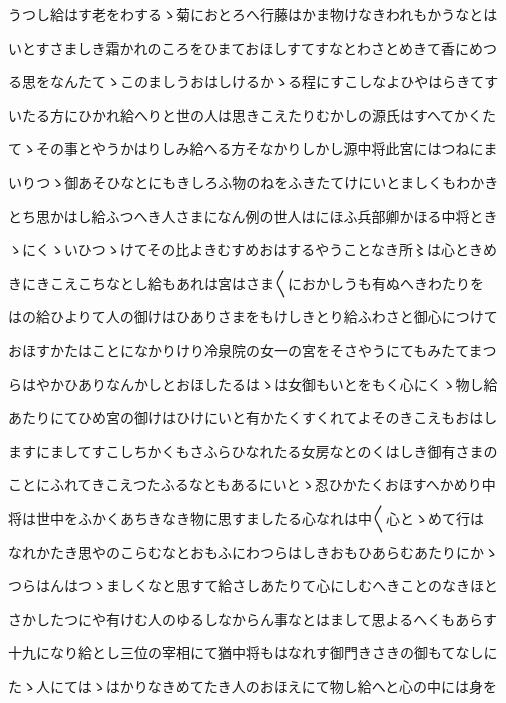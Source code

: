 \documentclass[a4paper,11pt,landscape]{ltjtarticle}
\begin{document}
\par\medskip
うつし給はす老をわするゝ菊におとろへ行藤はかま物けなきわれもかうなとは
\par\medskip
いとすさましき霜かれのころをひまておほしすてすなとわさとめきて香にめつ
\par\medskip
る思をなんたてゝこのましうおはしけるかゝる程にすこしなよひやはらきてす
\par\medskip
いたる方にひかれ給へりと世の人は思きこえたりむかしの源氏はすへてかくた
\par\medskip
てゝその事とやうかはりしみ給へる方そなかりしかし源中将此宮にはつねにま
\par\medskip
いりつゝ御あそひなとにもきしろふ物のねをふきたてけにいとましくもわかき
\par\medskip
とち思かはし給ふつへき人さまになん例の世人はにほふ兵部卿かほる中将とき
\par\medskip
ゝにくゝいひつゝけてその比よきむすめおはするやうことなき所〻は心ときめ
\par\medskip
きにきこえこちなとし給もあれは宮はさま〱におかしうも有ぬへきわたりを
\par\medskip
はの給ひよりて人の御けはひありさまをもけしきとり給ふわさと御心につけて
\par\medskip
おほすかたはことになかりけり冷泉院の女一の宮をそさやうにてもみたてまつ
\par\medskip
らはやかひありなんかしとおほしたるはゝは女御もいとをもく心にくゝ物し給
\par\medskip
あたりにてひめ宮の御けはひけにいと有かたくすくれてよそのきこえもおはし
\par\medskip
ますにましてすこしちかくもさふらひなれたる女房なとのくはしき御有さまの
\par\medskip
ことにふれてきこえつたふるなともあるにいとゝ忍ひかたくおほすへかめり中
\par\medskip
将は世中をふかくあちきなき物に思すましたる心なれは中〱心とゝめて行は
\par\medskip
なれかたき思やのこらむなとおもふにわつらはしきおもひあらむあたりにかゝ
\par\medskip
つらはんはつゝましくなと思すて給さしあたりて心にしむへきことのなきほと
\par\medskip
さかしたつにや有けむ人のゆるしなからん事なとはまして思よるへくもあらす
\par\medskip
十九になり給とし三位の宰相にて猶中将もはなれす御門きさきの御もてなしに
\par\medskip
たゝ人にてはゝはかりなきめてたき人のおほえにて物し給へと心の中には身を
\end{document}

